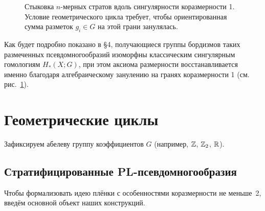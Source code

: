 \documentclass[12pt]{article}
\begin{document}
\begin{figure}[ht]
\centering
{}
\caption{Стыковка $n$-мерных стратов вдоль сингулярности коразмерности 1. Условие геометрического цикла требует, чтобы ориентированная сумма разметок $g_i \in G$ на этой грани занулялась.}\label{fig:pseudocycle}
\end{figure}

Как будет подробно показано в \S4, получающиеся группы бордизмов таких размеченных псевдомногообразий изоморфны классическим сингулярным гомологиям $H_*(X; G)$, при этом аксиома размерности восстанавливается именно благодаря алгебраическому занулению на гранях коразмерности 1 (см. рис.~\ref{fig:pseudocycle}).

\section{Геометрические циклы}

Зафиксируем абелеву группу коэффициентов $G$ (например, $\mathbb Z$, $\mathbb Z_2$, $\mathbb R$).

\subsection{Стратифицированные PL-псевдомногообразия}

Чтобы формализовать идею плёнки с особенностями коразмерности не меньше~2, введём основной объект наших конструкций.
\end{document}

